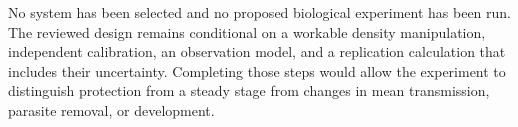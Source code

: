 No system has been selected and no proposed biological experiment has
been run. The reviewed design remains conditional on a workable density
manipulation, independent calibration, an observation model, and a
replication calculation that includes their uncertainty. Completing those
steps would allow the experiment to distinguish protection from a steady
stage from changes in mean transmission, parasite removal, or development.
